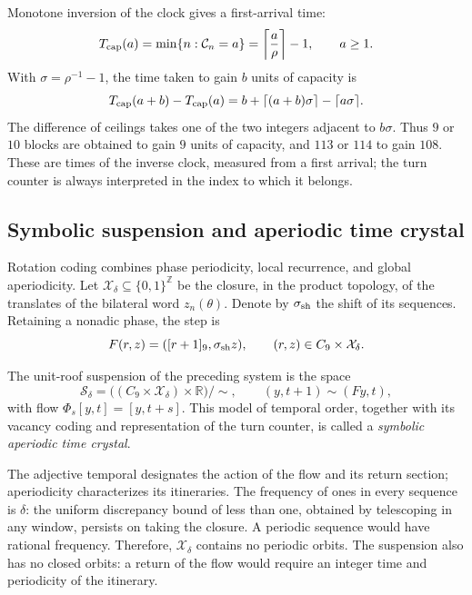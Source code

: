 Monotone inversion of the clock gives a first-arrival time:
\[
 T_{\rm cap}(a)=\min\{n:\mathcal C_n=a\}
 =\left\lceil\frac a\rho\right\rceil-1,
 \qquad a\geq1.
\]
With \(\sigma=\rho^{-1}-1\), the time taken to gain \(b\) units
of capacity is
\[
 T_{\rm cap}(a+b)-T_{\rm cap}(a)
 =b+\lceil(a+b)\sigma\rceil-\lceil a\sigma\rceil.
\]
The difference of ceilings takes one of the two integers adjacent to
\(b\sigma\). Thus \(9\) or \(10\) blocks are obtained to gain
\(9\) units of capacity, and \(113\) or \(114\) to gain \(108\).
These are times of the inverse clock, measured from a first arrival; the
turn counter is always interpreted in the index to which it belongs.

\subsection{Symbolic suspension and aperiodic time crystal}
\label{mono-ampl:cristal}

Rotation coding combines phase periodicity, local recurrence,
and global aperiodicity. Let \(\mathcal X_\delta\subseteq\{0,1\}^{\mathbb Z}\)
be the closure, in the product topology, of the translates of the
bilateral word \(z_n(\theta)\). Denote by \(\sigma_{\rm sh}\) the
shift of its sequences. Retaining a nonadic phase, the step is
\[
 F(r,z)=([r+1]_9,\sigma_{\rm sh}z),\qquad
 (r,z)\in C_9\times\mathcal X_\delta.
\]

\begin{definition}
\label{mono-ampl:def-cristal}
The unit-roof suspension of the preceding system is the space
\[
 \mathcal S_\delta=
 \bigl((C_9\times\mathcal X_\delta)\times\mathbb R\bigr)/\sim,
 \qquad (y,t+1)\sim(Fy,t),
\]
with flow \(\Phi_s[y,t]=[y,t+s]\). This model of temporal order,
together with its vacancy coding and representation of the turn counter,
is called a \emph{symbolic aperiodic time crystal}.
\end{definition}

The adjective temporal designates the action of the flow and its return section;
aperiodicity characterizes its itineraries. The frequency of ones in every
sequence is \(\delta\): the uniform discrepancy bound of less than one,
obtained by telescoping in any window, persists on taking the closure.
A periodic sequence would have rational frequency. Therefore,
\(\mathcal X_\delta\) contains no periodic orbits. The suspension
also has no closed orbits: a return of the flow would require an integer
time and periodicity of the itinerary.

